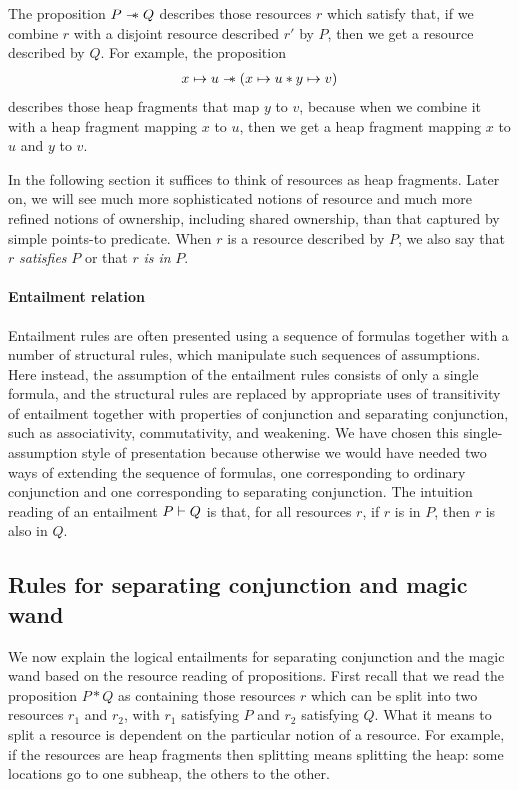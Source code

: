 The proposition $P\mathrel{-\!\!\ast} Q$ describes those resources $r$ which satisfy
that, if we combine $r$ with a disjoint resource described $r'$ by
$P$, then we get a resource described by $Q$.
For example, the proposition
\begin{align*}
  x\mapsto u\mathrel{-\!\!\ast} \left(x\mapsto u \ast y\mapsto v\right)
\end{align*}
describes those heap fragments that map $y$ to $v$, because when we combine it with a heap fragment mapping $x$ to $u$, then we get a heap fragment mapping $x$ to $u$ and $y$ to $v$.

In the following section it suffices to think of resources as heap fragments.
Later on, we will see much more sophisticated notions of resource and
much more refined notions of ownership, including shared ownership,
than that captured by simple points-to predicate.
When $r$ is a resource described by $P$, we also say that $r$
\emph{satisfies} $P$ or that $r$ \emph{is in} $P$. 

\paragraph{Entailment relation}
Entailment rules are often presented using a sequence of formulas together with a number of structural rules, which manipulate such sequences of assumptions.
Here instead, the assumption of the entailment rules consists of only a single formula, and the structural rules are replaced by appropriate uses of transitivity of entailment together with properties of conjunction and separating conjunction, such as associativity, commutativity, and weakening.
We have chosen this single-assumption style of presentation because otherwise we would have needed two ways of extending the sequence of formulas, one corresponding to ordinary conjunction and one corresponding to separating conjunction.
The intuition reading of an entailment $P\vdash Q$ is that, for all
resources $r$, if $r$ is in $P$, then $r$ is also in $Q$. 

\subsection{Rules for separating conjunction and magic wand}

We now explain the logical entailments for separating conjunction and the magic wand based on the resource reading of propositions.
First recall that we read the proposition $P \ast Q$ as containing those resources $r$ which can be split into two resources $r_1$ and $r_2$, with $r_1$ satisfying $P$ and $r_2$ satisfying $Q$.
What it means to split a resource is dependent on the particular notion of a resource.
For example, if the resources are heap fragments then splitting means splitting the heap: some locations go to one subheap, the others to the other.

